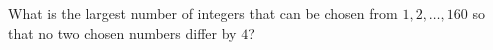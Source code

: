 What is the largest number of integers that can be chosen from $1,2,\dots,160$ so that no two chosen numbers differ by $4$?
